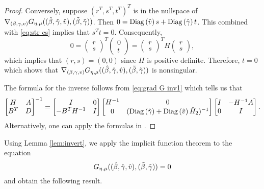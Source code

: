 \begin{proof}
Conversely, suppose $(r^T,s^T,t^T)^T$ is in the nullspace of 
$\nabla_{(\beta, \gamma,v)}G_{\eta,\mu}((\hat{\beta}, {\hat{\gamma}},{\hat v}),(\tilde\beta,{\tilde{\gamma}}))$. Then
$0=\mathrm{Diag}\left({\hat v}\right)s+\mathrm{Diag}\left({\hat{\gamma}}\right)t$. This combined with \eqref{eq:str cs} implies
that $s^Tt=0$. Consequently,
\[
0=\begin{pmatrix}r\\ s\end{pmatrix}^T\begin{pmatrix}0\\ t\end{pmatrix}
=\begin{pmatrix}r\\ s\end{pmatrix}^TH\begin{pmatrix}r\\ s\end{pmatrix},
\]
which implies that $(r,s)=(0,0)$ since $H$ is positive definite.
Therefore, $t=0$ which shows that 
$\nabla_{(\beta, \gamma,v)}G_{\eta,\mu}((\hat{\beta}, {\hat{\gamma}},{\hat v}),(\tilde\beta,{\tilde{\gamma}}))$ is
nonsingular.

The formula for the inverse follows from \eqref{eq:grad G inv1} which tells us that
\begin{equation}\label{eq:grad G inv2}
\begin{bmatrix}H&A\\ B^T&D\end{bmatrix}^{-1}=
\begin{bmatrix}I&0\\ -B^TH^{-1}&I\end{bmatrix}
\begin{bmatrix}H^{-1}&0\\ 0&(\mathrm{Diag}\left({\hat{\gamma}}\right)+\mathrm{Diag}\left({\hat v}\right)\hat H_{2})^{-1}\end{bmatrix}
\begin{bmatrix}I&-H^{-1}A\\ 0&I\end{bmatrix}.
\end{equation}
Alternatively, one can apply the formulas in \cite{LS02}.
\end{proof}

Using Lemma \ref{lem:invert}, we
apply the implicit function theorem to the equation 
\[
G_{\eta,\mu}((\hat{\beta}, {\hat{\gamma}},{\hat v}),(\tilde\beta,{\tilde{\gamma}}))=0
\] 
and obtain the following result.

